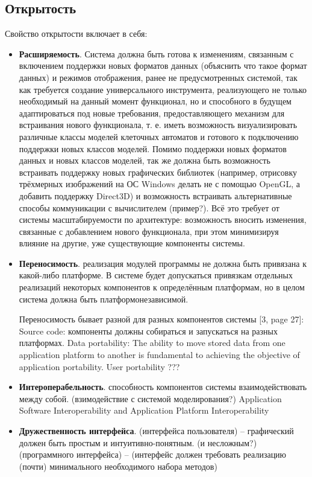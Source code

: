 \documentclass[a4paper,12pt]{extarticle}
\begin{document}
\subsection{Открытость}

Свойство открытости включает в себя:
\begin{itemize}
    \item \textbf{Расширяемость}.
        Система должна быть готова к изменениям, связанным с включением поддержки новых форматов данных (объяснить что такое формат данных) и режимов отображения, ранее не предусмотренных системой, так как требуется создание универсального инструмента, реализующего не только необходимый на данный момент функционал, но и способного в будущем адаптироваться под новые требования, предоставляющего механизм для встраивания нового функционала, т. е. иметь возможность визуализировать различные классы моделей клеточных автоматов и готового к подключению поддержки новых классов моделей. Помимо поддержки новых форматов данных и новых классов моделей, так же должна быть возможность встраивать поддержку новых графических библиотек (например, отрисовку трёхмерных изображений на ОС Windows делать не с помощью OpenGL, а добавить поддержку Direct3D) и возможность встраивать альтернативные способы коммуникации с вычислителем (пример?).
        Всё это требует от системы масштабируемости по архитектуре: возможность вносить изменения, связанные с добавлением нового функционала, при этом минимизируя влияние на другие, уже существующие компоненты системы.
        
   \item \textbf{Переносимость}.
        реализация модулей программы не должна быть привязана к какой-либо платформе. В системе будет допускаться привязкам отдельных реализаций некоторых компонентов к определённым платформам, но в целом система должна быть платформонезависимой.
        
        Переносимость бывает разной для разных компонентов системы [3, page 27]:
        Source code: компоненты должны собираться и запускаться на разных платформах.
        Data portability: The ability to move stored data from one application platform to another is fundamental to achieving the objective of application portability. 
        User portability ???
        
    \item \textbf{Интероперабельность}.
        способность компонентов системы взаимодействовать между собой. (взимодействие с системой моделирования?)
        Application Software Interoperability and Application Platform Interoperability
        
    \item \textbf{Дружественность интерфейса}.
        (интерфейса пользователя) – графический должен быть простым и интуитивно-понятным. (и несложным?)
        (программного интерфейса) –  (интерфейс должен требовать реализацию (почти) минимального необходимого набора методов)
\end{itemize}
\end{document}
